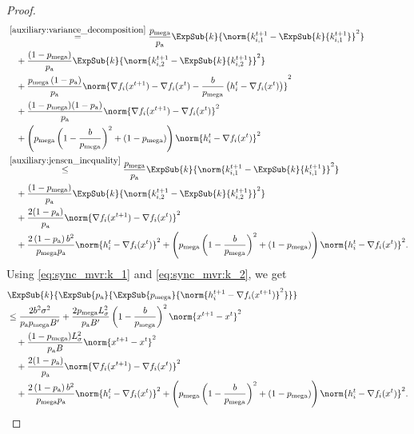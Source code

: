 \documentclass{article}
\newcommand*{\probavailable}{\ensuremath{p_{\textnormal{a}}}}
\newcommand*{\probmega}{\ensuremath{p_{\text{mega}}}}
\begin{document}
\begin{proof}
\begin{align*}
    &\overset{\eqref{auxiliary:variance_decomposition}}{=}\frac{\probmega}{\probavailable} \ExpSub{k}{\norm{k^{t+1}_{i, 1} - \ExpSub{k}{k^{t+1}_{i, 1}}}^2} \\
    &\quad + \frac{(1 - \probmega)}{\probavailable} \ExpSub{k}{\norm{k^{t+1}_{i, 2} - \ExpSub{k}{k^{t+1}_{i, 2}}}^2} \\
    &\quad + \frac{\probmega\left(1 - \probavailable\right)}{\probavailable} \norm{\nabla f_i(x^{t+1}) - \nabla f_i(x^{t}) - \frac{b}{\probmega} \left(h^t_i - \nabla f_i(x^{t})\right)}^2 \\
    &\quad + \frac{(1 - \probmega)(1 - \probavailable)}{\probavailable} \norm{\nabla f_i(x^{t+1}) - \nabla f_i(x^{t})}^2 \\
    &\quad + \left(\probmega \left(1 - \frac{b}{\probmega}\right)^2 + (1 - \probmega)\right) \norm{h^{t}_i - \nabla f_i(x^{t})}^2 \\
    &\overset{\eqref{auxiliary:jensen_inequality}}{\leq} \frac{\probmega}{\probavailable} \ExpSub{k}{\norm{k^{t+1}_{i, 1} - \ExpSub{k}{k^{t+1}_{i, 1}}}^2} \\
    &\quad + \frac{(1 - \probmega)}{\probavailable} \ExpSub{k}{\norm{k^{t+1}_{i, 2} - \ExpSub{k}{k^{t+1}_{i, 2}}}^2} \\
    &\quad + \frac{2(1 - \probavailable)}{\probavailable} \norm{\nabla f_i(x^{t+1}) - \nabla f_i(x^{t})}^2 \\
    &\quad + \frac{2\left(1 - \probavailable\right)b^2}{\probmega \probavailable} \norm{h^t_i - \nabla f_i(x^{t})}^2 + \left(\probmega \left(1 - \frac{b}{\probmega}\right)^2 + (1 - \probmega)\right) \norm{h^{t}_i - \nabla f_i(x^{t})}^2.
  \end{align*}
  Using \eqref{eq:sync_mvr:k_1} and \eqref{eq:sync_mvr:k_2}, we get
  \begin{align*}
    &\ExpSub{k}{\ExpSub{\probavailable}{\ExpSub{\probmega}{\norm{h^{t+1}_i - \nabla f_i(x^{t+1})}^2}}} \\
    &\leq \frac{2 b^2 \sigma^2}{\probavailable \probmega B'} + \frac{2 \probmega L_{\sigma}^2}{\probavailable B'}\left(1 - \frac{b}{\probmega}\right)^2 \norm{x^{t+1} - x^{t}}^2 \\
    &\quad + \frac{(1 - \probmega) L_{\sigma}^2}{\probavailable B} \norm{x^{t+1} - x^{t}}^2 \\
    &\quad + \frac{2(1 - \probavailable)}{\probavailable} \norm{\nabla f_i(x^{t+1}) - \nabla f_i(x^{t})}^2 \\
    &\quad + \frac{2\left(1 - \probavailable\right)b^2}{\probmega \probavailable} \norm{h^t_i - \nabla f_i(x^{t})}^2 + \left(\probmega \left(1 - \frac{b}{\probmega}\right)^2 + (1 - \probmega)\right) \norm{h^{t}_i - \nabla f_i(x^{t})}^2.

\end{align*}
\end{proof}
\end{document}
